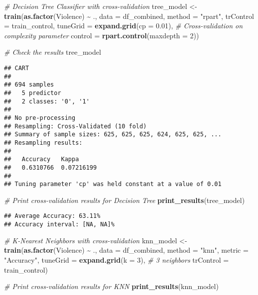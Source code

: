 \documentclass[
]{article}
\newenvironment{Shaded}{\begin{snugshade}}{\end{snugshade}}
\newcommand{\AttributeTok}[1]{\textcolor[rgb]{0.13,0.29,0.53}{#1}}
\newcommand{\CommentTok}[1]{\textcolor[rgb]{0.56,0.35,0.01}{\textit{#1}}}
\newcommand{\DecValTok}[1]{\textcolor[rgb]{0.00,0.00,0.81}{#1}}
\newcommand{\FloatTok}[1]{\textcolor[rgb]{0.00,0.00,0.81}{#1}}
\newcommand{\FunctionTok}[1]{\textcolor[rgb]{0.13,0.29,0.53}{\textbf{#1}}}
\newcommand{\NormalTok}[1]{#1}
\newcommand{\OtherTok}[1]{\textcolor[rgb]{0.56,0.35,0.01}{#1}}
\newcommand{\SpecialCharTok}[1]{\textcolor[rgb]{0.81,0.36,0.00}{\textbf{#1}}}
\newcommand{\StringTok}[1]{\textcolor[rgb]{0.31,0.60,0.02}{#1}}
\begin{document}
\begin{Shaded}
\begin{Highlighting}[]
\CommentTok{\# Decision Tree Classifier with cross{-}validation}
\NormalTok{tree\_model }\OtherTok{\textless{}{-}} \FunctionTok{train}\NormalTok{(}\FunctionTok{as.factor}\NormalTok{(Violence) }\SpecialCharTok{\textasciitilde{}}\NormalTok{ ., }\AttributeTok{data =}\NormalTok{ df\_combined, }
                    \AttributeTok{method =} \StringTok{"rpart"}\NormalTok{, }
                    \AttributeTok{trControl =}\NormalTok{ train\_control, }
                    \AttributeTok{tuneGrid =} \FunctionTok{expand.grid}\NormalTok{(}\AttributeTok{cp =} \FloatTok{0.01}\NormalTok{),  }\CommentTok{\# Cross{-}validation on complexity parameter}
                    \AttributeTok{control =} \FunctionTok{rpart.control}\NormalTok{(}\AttributeTok{maxdepth =} \DecValTok{2}\NormalTok{))}

\CommentTok{\# Check the results}
\NormalTok{tree\_model}
\end{Highlighting}
\end{Shaded}

\begin{verbatim}
## CART 
## 
## 694 samples
##   5 predictor
##   2 classes: '0', '1' 
## 
## No pre-processing
## Resampling: Cross-Validated (10 fold) 
## Summary of sample sizes: 625, 625, 625, 624, 625, 625, ... 
## Resampling results:
## 
##   Accuracy   Kappa     
##   0.6310766  0.07216199
## 
## Tuning parameter 'cp' was held constant at a value of 0.01
\end{verbatim}

\begin{Shaded}
\begin{Highlighting}[]
\CommentTok{\# Print cross{-}validation results for Decision Tree}
\FunctionTok{print\_results}\NormalTok{(tree\_model)}
\end{Highlighting}
\end{Shaded}

\begin{verbatim}
## Average Accuracy: 63.11%
## Accuracy interval: [NA, NA]%
\end{verbatim}

\begin{Shaded}
\begin{Highlighting}[]
\CommentTok{\# K{-}Nearest Neighbors with cross{-}validation}
\NormalTok{knn\_model }\OtherTok{\textless{}{-}} \FunctionTok{train}\NormalTok{(}\FunctionTok{as.factor}\NormalTok{(Violence) }\SpecialCharTok{\textasciitilde{}}\NormalTok{ ., }\AttributeTok{data =}\NormalTok{ df\_combined, }
                   \AttributeTok{method =} \StringTok{"knn"}\NormalTok{, }
                   \AttributeTok{metric =} \StringTok{"Accuracy"}\NormalTok{, }
                   \AttributeTok{tuneGrid =} \FunctionTok{expand.grid}\NormalTok{(}\AttributeTok{k =} \DecValTok{3}\NormalTok{),  }\CommentTok{\# 3 neighbors}
                   \AttributeTok{trControl =}\NormalTok{ train\_control)}

\CommentTok{\# Print cross{-}validation results for KNN}
\FunctionTok{print\_results}\NormalTok{(knn\_model)}
\end{Highlighting}
\end{Shaded}
\end{document}
